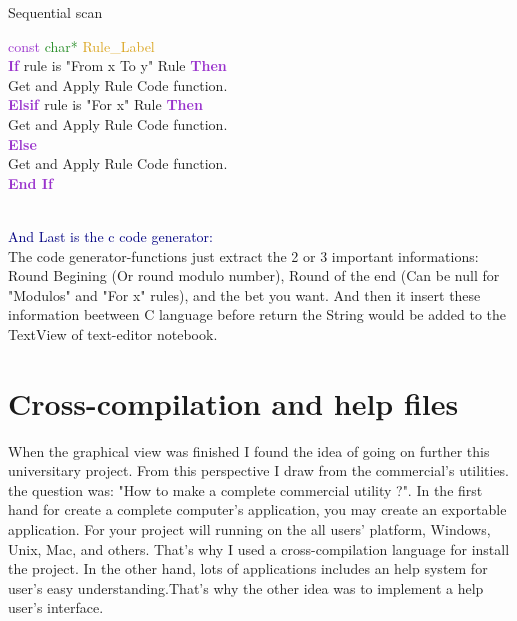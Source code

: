 \documentclass[11pt]{sample}
\renewcommand{\algorithmicif}      {\textbf{\textcolor{DarkOrchid}{If}}}
\renewcommand{\algorithmicendif}   {\textcolor{DarkOrchid}{\textbf{End If}}}
\renewcommand{\algorithmicelse}    {\textcolor{DarkOrchid}{\textbf{Else}}}
\renewcommand{\algorithmicthen}    {\textcolor{DarkOrchid}{\textbf{Then}}}
\newcommand{\algorithmicelseif}{\textbf{\textcolor{DarkOrchid}{Elsif }}}
\begin{document}
\begin{algorithm}
  \caption{Sequential scan}
  \begin{algorithmic} 
    \REQUIRE\textcolor{DarkOrchid}{const} \textcolor{ForestGreen}{char*} \textcolor{Goldenrod}{Rule\_Label}\\
    \algorithmicif{ rule is "From x To y" Rule }\algorithmicthen\\
    \hspace{4mm}Get and Apply Rule Code function.\\
    \algorithmicelseif{rule is "For x" Rule }\algorithmicthen\\ 
    \hspace{4mm}Get and Apply Rule Code function.\\
    \algorithmicelse\\
    \hspace{4mm}Get and Apply Rule Code function.\\
    \algorithmicendif
  \end{algorithmic}
\end{algorithm}\\
\textcolor{Navy}{And Last is the c code generator:}\\
The code generator-functions just extract the 2 or 3 important informations: Round Begining (Or round modulo number), Round of the end (Can be null for "Modulos" and "For x" rules), and the bet you want. And then it insert these information beetween C language before return the String would be added to the TextView of text-editor notebook. 
\newpage
\section{Cross-compilation and help files}
When the graphical view was finished I found the idea of going on further this universitary project. From this perspective I draw from the commercial's utilities. the question was: "How to make a complete commercial utility ?". In the first hand for create a complete computer's application, you may create an exportable application. For your project will running on the all users' platform, Windows, Unix, Mac, and others. That's why I used a cross-compilation language for install the project. In the other hand, lots of applications includes an help system for user's easy understanding.That's why the other idea was to implement a help user's interface.
\end{document}
